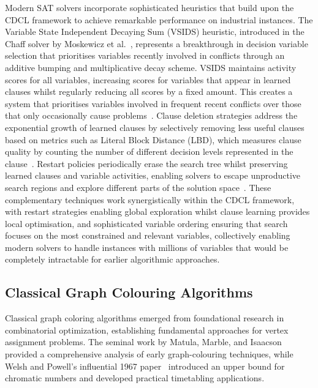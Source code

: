 Modern SAT solvers incorporate sophisticated heuristics that build upon the CDCL framework to achieve remarkable performance on industrial instances. The Variable State Independent Decaying Sum (VSIDS) heuristic, introduced in the Chaff solver by Moskewicz et al.~\cite{moskewicz2001chaff}, represents a breakthrough in decision variable selection that prioritises variables recently involved in conflicts through an additive bumping and multiplicative decay scheme. VSIDS maintains activity scores for all variables, increasing scores for variables that appear in learned clauses whilst regularly reducing all scores by a fixed amount. This creates a system that prioritises variables involved in frequent recent conflicts over those that only occasionally cause problems~\cite{liang2015understanding}. Clause deletion strategies address the exponential growth of learned clauses by selectively removing less useful clauses based on metrics such as Literal Block Distance (LBD), which measures clause quality by counting the number of different decision levels represented in the clause~\cite{audemard2017learned}. Restart policies periodically erase the search tree whilst preserving learned clauses and variable activities, enabling solvers to escape unproductive search regions and explore different parts of the solution space~\cite{liang2018machine}. These complementary techniques work synergistically within the CDCL framework, with restart strategies enabling global exploration whilst clause learning provides local optimisation, and sophisticated variable ordering ensuring that search focuses on the most constrained and relevant variables, collectively enabling modern solvers to handle instances with millions of variables that would be completely intractable for earlier algorithmic approaches.

\subsection{Classical Graph Colouring Algorithms}
Classical graph coloring algorithms emerged from foundational research in combinatorial optimization, establishing fundamental approaches for vertex assignment problems. The seminal work by Matula, Marble, and Isaacson~\cite{matula1972graph} provided a comprehensive analysis of early graph-colouring techniques, while Welsh and Powell's influential 1967 paper~\cite{welsh1967upper} introduced an upper bound for chromatic numbers and developed practical timetabling applications.

